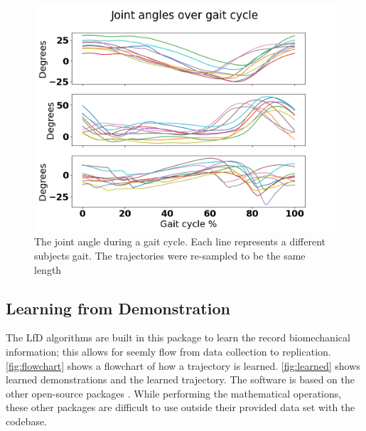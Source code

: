 \begin{figure}[h]
  \centering
    \includegraphics[scale=0.5]{images/software/gaitcycle.png}
    \caption[Gait Cycles]{The joint angle during a gait cycle. Each line represents a different subjects gait. The trajectories were re-sampled to be the same length}
    \label{fig:gaitDetection}
\end{figure}



\subsection{Learning from Demonstration}

The LfD algorithms are built in this package to learn the record biomechanical information; this allows for seemly flow from data collection to replication. \autoref{fig:flowchart} shows a flowchart of how a trajectory is learned. \autoref{fig:learned} shows learned demonstrations and the learned trajectory. The software is based on the other open-source packages \cite{calinon2016tutorial}. While performing the mathematical operations, these other packages are difficult to use outside their provided data set with the codebase. 


